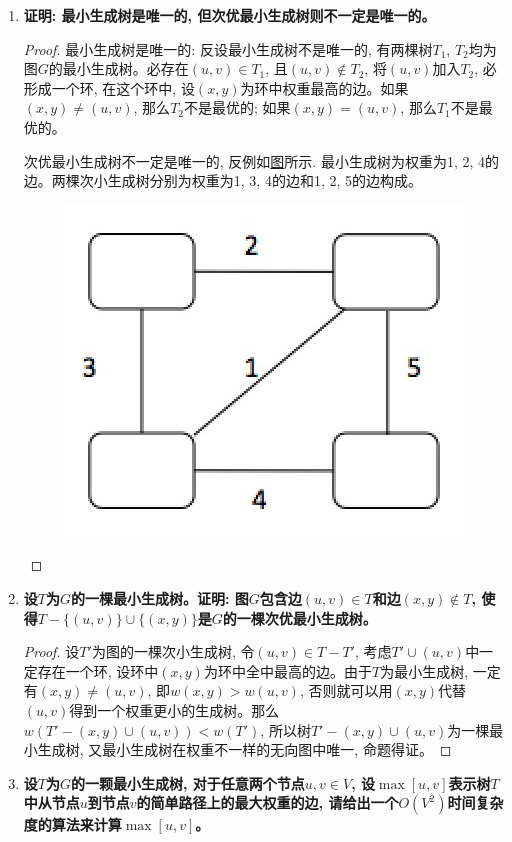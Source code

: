 \documentclass[paper=a4, fontsize=11pt]{scrartcl} %
\numberwithin{equation}{section} %
\numberwithin{figure}{section} %
\numberwithin{table}{section} %
\begin{document}
\begin{enumerate}[a]
\item \textbf{证明: 最小生成树是唯一的, 但次优最小生成树则不一定是唯一的。}

  \begin{proof}
    最小生成树是唯一的: 反设最小生成树不是唯一的, 有两棵树$T_1$, $T_2$均为图$G$的最小生成树。必存在$(u, v) \in T_1$, 且$(u, v) \notin T_2$, 将$(u, v)$加入$T_2$, 必形成一个环, 在这个环中, 设$(x, y)$为环中权重最高的边。如果$(x, y) \neq (u, v)$, 那么$T_2$不是最优的; 如果$(x, y) = (u, v)$, 那么$T_1$不是最优的。

    次优最小生成树不一定是唯一的, 反例如\hyperref[fig:1]{图}所示. 最小生成树为权重为1, 2, 4的边。两棵次小生成树分别为权重为1, 3, 4的边和1, 2, 5的边构成。

  \begin{figure}
    \centering
    \includegraphics[height=32ex]{1}
    \label{fig:1}
  \end{figure}
  \end{proof}

\item \textbf{设$T$为$G$的一棵最小生成树。证明: 图$G$包含边$(u, v) \in T$和边$(x, y) \notin T$, 使得$T - \{(u, v)\} \cup \{(x, y)\}$是$G$的一棵次优最小生成树。}

  \begin{proof}
设$T'$为图的一棵次小生成树, 令$(u, v) \in T − T'$, 考虑$T' \cup (u, v)$中一定存在一个环, 设环中$(x, y)$为环中全中最高的边。由于$T$为最小生成树, 一定有$(x, y) \neq (u, v)$, 即$w(x, y) > w(u, v)$, 否则就可以用$(x, y)$代替$(u, v)$得到一个权重更小的生成树。那么$w(T' - (x, y) \cup (u, v)) < w(T')$, 所以树$T' - (x, y) \cup (u,v)$为一棵最小生成树, 又最小生成树在权重不一样的无向图中唯一, 命题得证。
  \end{proof}

\item \textbf{设$T$为$G$的一颗最小生成树, 对于任意两个节点$u, v \in V$, 设$\max[u, v]$表示树$T$中从节点$u$到节点$v$的简单路径上的最大权重的边, 请给出一个$O(V^2)$时间复杂度的算法来计算$\max[u, v]$。}


\end{enumerate}
\end{document}
